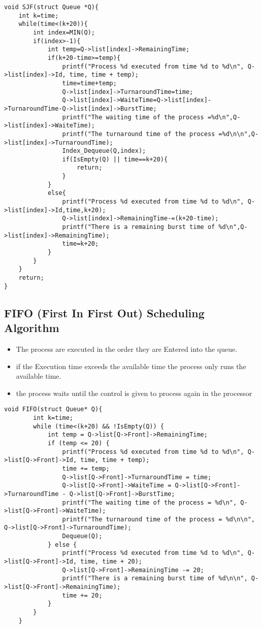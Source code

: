 \documentclass{article}
\begin{document}
\begin{lstlisting}[basicstyle=\footnotesize]
void SJF(struct Queue *Q){
    int k=time;
    while(time<(k+20)){
        int index=MIN(Q);
        if(index>-1){
            int temp=Q->list[index]->RemainingTime;
            if(k+20-time>=temp){
                printf("Process %d executed from time %d to %d\n", Q->list[index]->Id, time, time + temp);
                time=time+temp;
                Q->list[index]->TurnaroundTime=time;
                Q->list[index]->WaiteTime=Q->list[index]->TurnaroundTime-Q->list[index]->BurstTime;
                printf("The waiting time of the process =%d\n",Q->list[index]->WaiteTime);
                printf("The turnaround time of the process =%d\n\n",Q->list[index]->TurnaroundTime);
                Index_Dequeue(Q,index);
                if(IsEmpty(Q) || time==k+20){
                    return;
                }
            }
            else{
                printf("Process %d executed from time %d to %d\n", Q->list[index]->Id,time,k+20);
                Q->list[index]->RemainingTime-=(k+20-time);
                printf("There is a remaining burst time of %d\n",Q->list[index]->RemainingTime);
                time=k+20;
            }
        }
    }
    return;
}
\end{lstlisting}

\subsection{FIFO (First In First Out) Scheduling Algorithm}
\begin{itemize}
    \item The process are executed in the order they are Entered into the queue.
    \item if the Execution time exceeds the available time the process only runs the available time.
    \item the process waits until the control is given to process again in the processor
\end{itemize}

\begin{lstlisting}[basicstyle=\footnotesize]
    void FIFO(struct Queue* Q){ 
        int k=time;
        while (time<(k+20) && !IsEmpty(Q)) {
            int temp = Q->list[Q->Front]->RemainingTime;
            if (temp <= 20) {
                printf("Process %d executed from time %d to %d\n", Q->list[Q->Front]->Id, time, time + temp);
                time += temp;
                Q->list[Q->Front]->TurnaroundTime = time;
                Q->list[Q->Front]->WaiteTime = Q->list[Q->Front]->TurnaroundTime - Q->list[Q->Front]->BurstTime;
                printf("The waiting time of the process = %d\n", Q->list[Q->Front]->WaiteTime);
                printf("The turnaround time of the process = %d\n\n", Q->list[Q->Front]->TurnaroundTime);
                Dequeue(Q);
            } else {
                printf("Process %d executed from time %d to %d\n", Q->list[Q->Front]->Id, time, time + 20);
                Q->list[Q->Front]->RemainingTime -= 20;
                printf("There is a remaining burst time of %d\n\n", Q->list[Q->Front]->RemainingTime);
                time += 20;
            }
        }
    }
\end{lstlisting}
\end{document}
